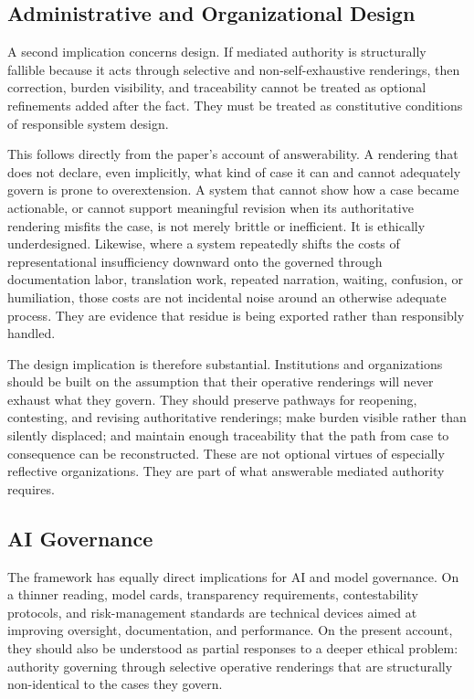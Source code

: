 \documentclass[11pt]{article}
\begin{document}
\subsection{Administrative and Organizational Design}

A second implication concerns design. If mediated authority is structurally fallible because it acts through selective and non-self-exhaustive renderings, then correction, burden visibility, and traceability cannot be treated as optional refinements added after the fact. They must be treated as constitutive conditions of responsible system design.

This follows directly from the paper's account of answerability. A rendering that does not declare, even implicitly, what kind of case it can and cannot adequately govern is prone to overextension. A system that cannot show how a case became actionable, or cannot support meaningful revision when its authoritative rendering misfits the case, is not merely brittle or inefficient. It is ethically underdesigned. Likewise, where a system repeatedly shifts the costs of representational insufficiency downward onto the governed through documentation labor, translation work, repeated narration, waiting, confusion, or humiliation, those costs are not incidental noise around an otherwise adequate process. They are evidence that residue is being exported rather than responsibly handled.

The design implication is therefore substantial. Institutions and organizations should be built on the assumption that their operative renderings will never exhaust what they govern. They should preserve pathways for reopening, contesting, and revising authoritative renderings; make burden visible rather than silently displaced; and maintain enough traceability that the path from case to consequence can be reconstructed. These are not optional virtues of especially reflective organizations. They are part of what answerable mediated authority requires.

\subsection{AI Governance}

The framework has equally direct implications for AI and model governance. On a thinner reading, model cards, transparency requirements, contestability protocols, and risk-management standards are technical devices aimed at improving oversight, documentation, and performance. On the present account, they should also be understood as partial responses to a deeper ethical problem: authority governing through selective operative renderings that are structurally non-identical to the cases they govern. \cite{LepriEtAl2018FairTransparentAccountableADM,Tabassi2023NISTAIRMF}
\end{document}
